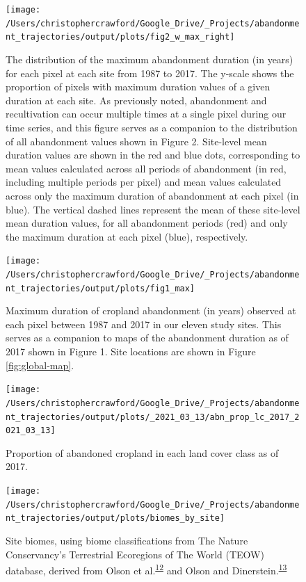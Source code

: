 \documentclass[
]{article}
\begin{document}
\begin{figure}
\texttt{[image: /Users/christophercrawford/Google\_Drive/\_Projects/abandonment\_trajectories/output/plots/fig2\_w\_max\_right]} \caption{The distribution of the maximum abandonment duration (in years) for each pixel at each site from 1987 to 2017. The y-scale shows the proportion of pixels with maximum duration values of a given duration at each site. As previously noted, abandonment and recultivation can occur multiple times at a single pixel during our time series, and this figure serves as a companion to the distribution of all abandonment values shown in Figure 2. Site-level mean duration values are shown in the red and blue dots, corresponding to mean values calculated across all periods of abandonment (in red, including multiple periods per pixel) and mean values calculated across only the maximum duration of abandonment at each pixel (in blue). The vertical dashed lines represent the mean of these site-level mean duration values, for all abandonment periods (red) and only the maximum duration at each pixel (blue), respectively.}\label{fig:mean-abn-duration-w-max}
\end{figure}



\begin{figure}
\texttt{[image: /Users/christophercrawford/Google\_Drive/\_Projects/abandonment\_trajectories/output/plots/fig1\_max]} \caption{Maximum duration of cropland abandonment (in years) observed at each pixel between 1987 and 2017 in our eleven study sites. This serves as a companion to maps of the abandonment duration as of 2017 shown in Figure 1. Site locations are shown in Figure \ref{fig:global-map}.}\label{fig:maps-max-abn-duration}
\end{figure}



\begin{figure}
\texttt{[image: /Users/christophercrawford/Google\_Drive/\_Projects/abandonment\_trajectories/output/plots/\_2021\_03\_13/abn\_prop\_lc\_2017\_2021\_03\_13]} \caption{Proportion of abandoned cropland in each land cover class as of 2017.}\label{fig:abn-prop-lc}
\end{figure}



\begin{figure}
\texttt{[image: /Users/christophercrawford/Google\_Drive/\_Projects/abandonment\_trajectories/output/plots/biomes\_by\_site]} \caption{Site biomes, using biome classifications from The Nature Conservancy's Terrestrial Ecoregions of The World (TEOW) database, derived from Olson et al.\textsuperscript{\protect\hyperlink{ref-Olson2001}{12}} and Olson and Dinerstein.\textsuperscript{\protect\hyperlink{ref-Olson2002}{13}}}\label{fig:site-biomes}
\end{figure}
\end{document}
